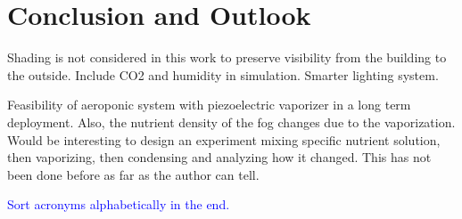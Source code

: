 \chapter{Conclusion and Outlook}
\label{chap:conclusion}
%
Shading is not considered in this work to preserve visibility from the building to the outside.
Include CO2 and humidity in simulation.
Smarter lighting system.

Feasibility of aeroponic system with piezoelectric vaporizer in a long term deployment.
Also, the nutrient density of the fog changes due to the vaporization.
Would be interesting to design an experiment mixing specific nutrient solution, then vaporizing, then condensing and analyzing how it changed.
This has not been done before as far as the author can tell.

\textcolor{Blue}{Sort acronyms alphabetically in the end.}
